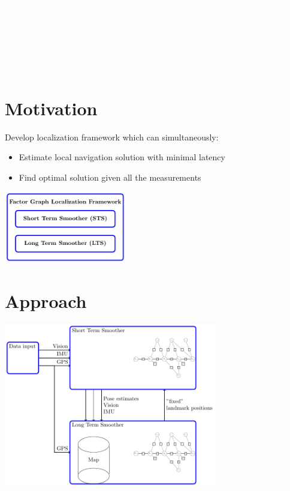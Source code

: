 \documentclass[%
    fourtothree=true, %
    DepLogo=true     %
    ]{ETHpres}
\newcommand*{\ETHtitle}{Closed-loop multi-sensor SLAM using factor graphs for fixed-wing UAV.}
\newcommand*{\ETHauthor}{Adam Radomski}
\begin{document}
\ETHtitelbild\textcolor{white}{\large\textbf{\ETHtitle}}\\~\newline\hspace{6mm}\normalsize%
\textcolor{white}{
\textbf{\ETHauthor}\\ \\
Master Thesis\\
Supervised by Timo Hinzmann, Thomas Schneider}\\


\ETHslide
\section*{Motivation}
Develop localization framework which can simultaneously:
\begin{itemize}
	\item[\ETHitem] Estimate local navigation solution with minimal latency
	\item[\ETHitem] Find optimal solution given all the measurements
\end{itemize}

\begin{center}
\includegraphics[width=0.4\textwidth]{TikZ_drawings/Simple_STS_and_LTS_diagram/Simple_STS_and_LTS.pdf}\\
\end{center}

\clearpage

\ETHslide
\section*{Approach}
\begin{center}
\includegraphics[width=0.7\textwidth]{TikZ_drawings/STS_and_LTS/STS_and_LTS.pdf}\\
\end{center}
\end{document}
